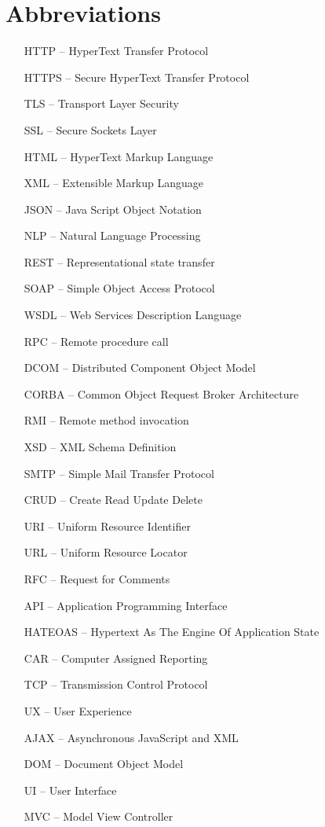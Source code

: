 \section*{Abbreviations}

\begin{itemize}[leftmargin=2cm, topsep=0pt, partopsep=5pt,itemsep=0pt,parsep=0pt]
\item[HTTP --] HyperText Transfer Protocol
\item[HTTPS --] Secure HyperText Transfer Protocol
\item[TLS --] Transport Layer Security
\item[SSL --] Secure Sockets Layer
\item[HTML --] HyperText Markup Language
\item[XML --] Extensible Markup Language
\item[JSON --] Java Script Object Notation
\item[NLP --] Natural Language Processing
\item[REST --] Representational state transfer
\item[SOAP --] Simple Object Access Protocol
\item[WSDL --] Web Services Description Language
\item[RPC --] Remote procedure call
\item[DCOM --] Distributed Component Object Model
\item[CORBA --] Common Object Request Broker Architecture
\item[RMI --] Remote method invocation
\item[XSD --] XML Schema Definition
\item[SMTP --] Simple Mail Transfer Protocol
\item[CRUD --] Create Read Update Delete
\item[URI --] Uniform Resource Identifier
\item[URL --] Uniform Resource Locator
\item[RFC --] Request for Comments
\item[API --] Application Programming Interface
\item[HATEOAS --] Hypertext As The Engine Of Application State
\item[CAR --] Computer Assigned Reporting
\item[TCP --] Transmission Control Protocol
\item[UX --] User Experience
\item[AJAX --] Asynchronous JavaScript and XML
\item[DOM --] Document Object Model
\item[UI --] User Interface
\item[MVC --] Model View Controller
\end{itemize}